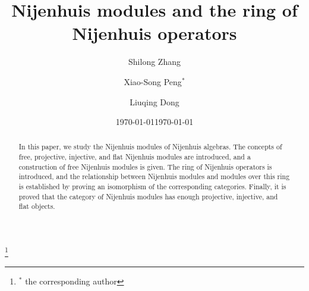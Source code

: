 \documentclass[12pt]{amsart}
\theoremstyle{definition}
\begin{document}
\title[Nijenhuis modules and the ring of Nijenhuis operators]{Nijenhuis modules and the ring of Nijenhuis operators}

\author{Shilong Zhang}
\address{College of Science, Northwest A$\&$F University, Yangling 712100, Shaanxi, P.\,R. China}


\author{Xiao-Song Peng$^{\ast}$}
\address{School of Mathematics and Statistics,
Jiangsu Normal University, Xuzhou, Jiangsu 221116, P.\,R. China}
\thanks{$^{\ast}$ the corresponding author}

\author{Liuqing Dong}
\address{College of Science, Northwest A$\&$F University, Yangling 712100, Shaanxi, P.\,R. China}




\date{\today}
\begin{abstract}
In this paper, we study the Nijenhuis modules of Nijenhuis algebras. The concepts of free, projective, injective, and flat Nijenhuis modules are introduced, and a construction of free Nijenhuis modules is given. The ring of Nijenhuis operators is introduced, and the relationship between Nijenhuis modules and modules over this ring is established by proving an isomorphism of the corresponding categories. Finally, it is proved that the category of Nijenhuis modules has enough projective, injective, and flat objects.
\end{abstract}



\date{\today}

\maketitle

\tableofcontents



\setcounter{section}{0}

\end{document}
